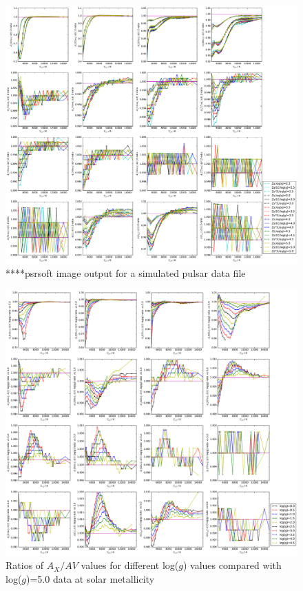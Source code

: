 \documentclass[12pt, a4paper]{report}
\begin{document}
\begin{figure}
\begin{center}
\includegraphics[scale=0.3]{../Aall_ratio_Zs_div_Z2_effect_high_logg_zoom_15000.pdf}
\caption{****psrsoft image output for a simulated pulsar data file}
\label{all_Z_Z2_ratio}
\end{center}
\end{figure}

\begin{figure}
\begin{center}
\includegraphics[scale=0.3]{../Aall_ratio_all_logg_div_5p0_effect.pdf}
\caption{Ratios of $A_{X}/A{V}$ values for different log($g$) values compared with log($g$)=5.0 data at solar metallicity}
\label{all_logg_logg5_ratio}
\end{center}
\end{figure}
\end{document}
